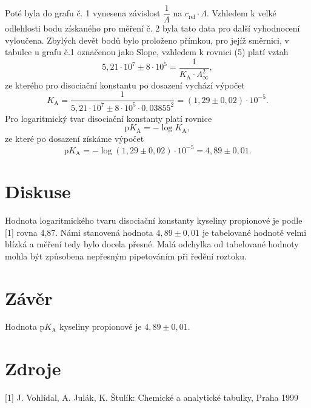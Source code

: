 \documentclass[12pt,a4paper]{article}
\def\ri#1{\mathrm{#1}}
\begin{document}
Poté byla do grafu č. 1 vynesena závislost $\dfrac{1}{\Lambda}$ na $c_\ri{rel}\cdot \Lambda$. Vzhledem k velké odlehlosti bodu získaného pro měření č. 2 byla tato data pro další vyhodnocení vyloučena. Zbylých devět bodů bylo proloženo přímkou, pro jejíž směrnici, v tabulce u grafu č.1  označenou jako Slope, vzhledem k rovnici (5) platí vztah 
\begin{equation}
	5,21\cdot 10^7 \pm 8\cdot 10^5 = \dfrac{1}{K_\ri{A}\cdot \Lambda_\infty^2},
\end{equation}
ze kterého pro disociační konstantu po dosazení vychází výpočet
$$K_\ri{A} = \dfrac{1}{	5,21\cdot 10^7 \pm 8\cdot 10^5 \cdot 0,03855^2} = (1,29\pm 0,02)\cdot 10^{-5}.$$
Pro logaritmický tvar disociační konstanty platí rovnice
\begin{equation}
	\ri{p}K_\ri{A} = -\log K_\ri{A},
\end{equation}
ze které po dosazení získáme výpočet
$$\ri{p}K_\ri{A} = -\log (1,29\pm 0,02)\cdot 10^{-5} = 4,89\pm 0,01.$$
\section*{Diskuse}
Hodnota logaritmického tvaru disociační konstanty kyseliny propionové je podle [1] rovna 4,87. Námi stanovená hodnota $4,89\pm 0,01$ je tabelované hodnotě velmi blízká a měření tedy bylo docela přesné. Malá odchylka od tabelované hodnoty mohla být způsobena nepřesným pipetováním při ředění roztoku.
\section*{Závěr}
Hodnota p$K_\ri{A}$ kyseliny propionové je $4,89\pm 0,01$.
\section*{Zdroje}
[1] J. Vohlídal, A. Julák, K. Štulík: Chemické a analytické tabulky, Praha 1999
\end{document}
